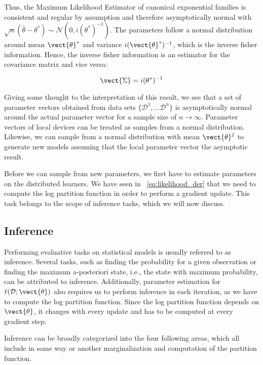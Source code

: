         Thus, the Maximum Likelihood Estimator of canonical exponential families is consistent and  regular by assumption and therefore asymptotically normal with $\sqrt{n}(\hat{\theta} - \theta^*) \sim \mathcal{N}(0, i(\theta^*)^{-1})$.
        The parameters follow a normal distribution around mean $\vect{\theta}^*$ and variance $i(\vect{\theta}^*)^{-1}$, which is the inverse fisher information.
        Hence, the inverse fisher information is an estimator for the covariance matrix and vice versa:
        
        \begin{equation}
            \vect{\Sigma} =  i(\theta^*)^{-1}
        \end{equation}

        Giving some thought to the interpretation of this result, we see that a set of parameter vectors obtained from data sets $\{\mathcal{D}^1, \ldots \mathcal{D}^n\}$ is asymptotically normal around the actual parameter vector for a sample size of $n \rightarrow \infty$.
        Parameter vectors of local devices can be treated as samples from a normal distribution.
        Likewise, we can sample from a normal distribution with mean $\vect{\theta}^j$ to generate new models assuming that the local parameter vector the asymptotic result.
        
        Before we can sample from new parameters, we first have to estimate parameters on the distributed learners. 
        We have seen in \eq~\ref{eq:likelihood_der} that we need to compute the log partition function in order to perform a gradient update.
        This task belongs to the scope of inference tasks, which we will now discuss.

\subsection{Inference}
\label{ssec:inf}
Performing evaluative tasks on statistical models is usually referred to as inference.
Several tasks, such as finding the probability for a given observation or finding the maximum a-posteriori state, i.e., the state with maximum probability, can be attributed to inference.
Additionally, parameter estimation for $\ell(\mathcal{D}; \vect{\theta})$ also requires us to perform inference in each iteration, as we have to compute the log partition function.
Since the log partition function depends on $\vect{\theta}$, it changes with every update and has to be computed at every gradient step.

Inference can be broadly categorized into the four following areas, which all include in some way or another marginalization and computation of the partition function.

